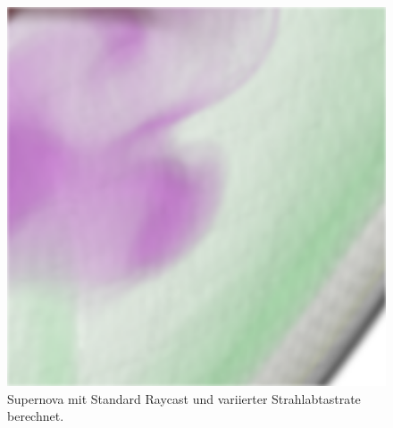\begin{figure}[]
\begin{minipage}[t]{0.3\textwidth}
	\end{minipage}
	\hfill
	\begin{minipage}[t]{0.3\textwidth}
		\centering
		\includegraphics[width=1\textwidth]{../../Neue_Messungen/Supernova/cut/st_ors/st_ors_3.png}
	\end{minipage}
	\caption{Supernova mit Standard Raycast und variierter Strahlabtastrate berechnet.}
	\label{fig::res::sn_comp_st_ors}
\end{figure}

